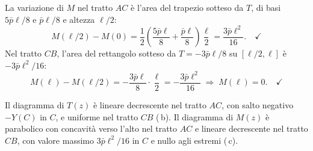 \begin{esempio}
\begin{svolgimento}
		La variazione di $M$ nel tratto $AC$ è l'area
		del trapezio sotteso da $T$, di basi
		$5\bar{p}\ell/8$ e $\bar{p}\ell/8$ e altezza
		$\ell/2$:
		\[
		M(\ell/2) - M(0)
		= \frac{1}{2}\!\left(\frac{5\bar{p}\ell}{8}
		+ \frac{\bar{p}\ell}{8}\right)\frac{\ell}{2}
		= \frac{3\bar{p}\ell^2}{16}. \quad\checkmark
		\]
		Nel tratto $CB$, l'area del rettangolo sotteso
		da $T = -3\bar{p}\ell/8$ su $[\ell/2,\ell]$ è
		$-3\bar{p}\ell^2/16$:
		\[
		M(\ell) - M(\ell/2)
		= -\frac{3\bar{p}\ell}{8}\cdot\frac{\ell}{2}
		= -\frac{3\bar{p}\ell^2}{16}
		\;\Rightarrow\; M(\ell) = 0. \quad\checkmark
		\]
		
		\noindent
		Il diagramma di $T(z)$ è lineare decrescente nel
		tratto $AC$, con salto negativo $-Y(C)$ in $C$,
		e uniforme nel tratto $CB$ (\,b).
		Il diagramma di $M(z)$ è parabolico con concavità
		verso l'alto nel tratto $AC$ e lineare decrescente
		nel tratto $CB$, con valore massimo $3\bar{p}\ell^2/16$
		in $C$ e nullo agli estremi (\,c).
		
	\end{svolgimento}
\end{esempio}


